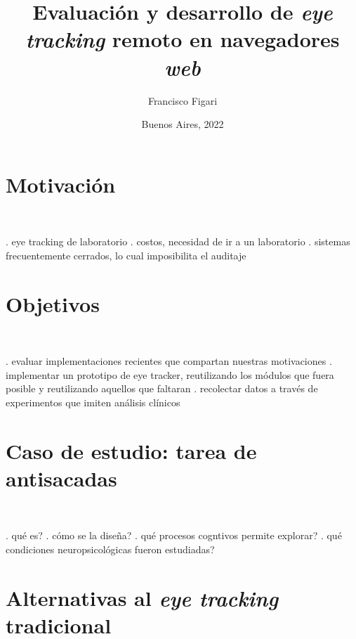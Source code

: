 \documentclass{beamer}
\title{Evaluación y desarrollo de \textit{eye tracking} remoto en navegadores
\textit{web}}
\author{Francisco Figari}
\date{Buenos Aires, 2022}
\begin{document}

\frame{\titlepage}

\section{Motivación}

\begin{frame}{~}

. eye tracking de laboratorio
. costos, necesidad de ir a un laboratorio
. sistemas frecuentemente cerrados, lo cual imposibilita el auditaje

\end{frame}

\section{Objetivos}

\begin{frame}{~}

. evaluar implementaciones recientes que compartan nuestras motivaciones 
. implementar un prototipo de eye tracker, reutilizando los módulos que fuera
  posible y reutilizando aquellos que faltaran
. recolectar datos a través de experimentos que imiten análisis clínicos

\end{frame}

\section{Caso de estudio: tarea de antisacadas}

\begin{frame}{~}

. qué es?
. cómo se la diseña?
. qué procesos cogntivos permite explorar?
. qué condiciones neuropsicológicas fueron estudiadas?

\end{frame}

\section{Alternativas al \textit{eye tracking} tradicional}
\end{document}
